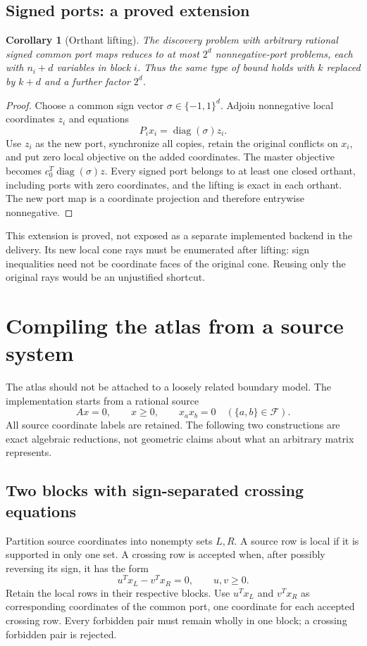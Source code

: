 \documentclass[11pt,a4paper]{article}
\newtheorem{corollary}[theorem]{Corollary}
\theoremstyle{definition}
\theoremstyle{remark}
\begin{document}
\subsection{Signed ports: a proved extension}
\begin{corollary}[Orthant lifting]
\label{cor:signed}
The discovery problem with arbitrary rational signed common port maps reduces to at most $2^d$ nonnegative-port problems, each with $n_i+d$ variables in block $i$. Thus the same type of bound holds with $k$ replaced by $k+d$ and a further factor $2^d$.
\end{corollary}
\begin{proof}
Choose a common sign vector $\sigma\in\{-1,1\}^d$. Adjoin nonnegative local coordinates $z_i$ and equations
\[
 P_i x_i=\operatorname{diag}(\sigma)z_i.
\]
Use $z_i$ as the new port, synchronize all copies, retain the original conflicts on $x_i$, and put zero local objective on the added coordinates. The master objective becomes $c_0^T\operatorname{diag}(\sigma)z$. Every signed port belongs to at least one closed orthant, including ports with zero coordinates, and the lifting is exact in each orthant. The new port map is a coordinate projection and therefore entrywise nonnegative.
\end{proof}

This extension is proved, not exposed as a separate implemented backend in the delivery. Its new local cone rays must be enumerated after lifting: sign inequalities need not be coordinate faces of the original cone. Reusing only the original rays would be an unjustified shortcut.



\section{Compiling the atlas from a source system}
\label{sec:source}
The atlas should not be attached to a loosely related boundary model. The implementation starts from a rational source
\begin{equation}
 Ax=0,\qquad x\ge0,\qquad x_ax_b=0\quad(\{a,b\}\in\mathcal F).
 \label{eq:source}
\end{equation}
All source coordinate labels are retained. The following two constructions are exact algebraic reductions, not geometric claims about what an arbitrary matrix represents.

\subsection{Two blocks with sign-separated crossing equations}
Partition source coordinates into nonempty sets $L,R$. A source row is local if it is supported in only one set. A crossing row is accepted when, after possibly reversing its sign, it has the form
\[
 u^Tx_L-v^Tx_R=0,\qquad u,v\ge0.
\]
Retain the local rows in their respective blocks. Use $u^Tx_L$ and $v^Tx_R$ as corresponding coordinates of the common port, one coordinate for each accepted crossing row. Every forbidden pair must remain wholly in one block; a crossing forbidden pair is rejected.
\end{document}

